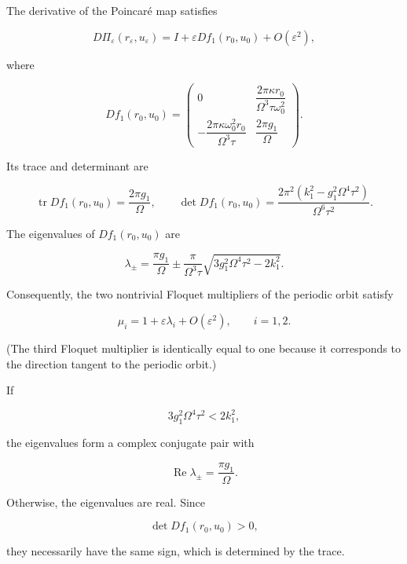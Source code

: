 \documentclass[11pt,reqno]{amsart}
\theoremstyle{plain}
\theoremstyle{definition}
\theoremstyle{remark}
\begin{document}
The derivative of the Poincaré map satisfies

\begin{equation}
\label{eq:poincare-derivative}
\boxed{
D\Pi_\varepsilon(r_\varepsilon,u_\varepsilon)
=
I
+
\varepsilon
Df_1(r_0,u_0)
+
O(\varepsilon^2),
}
\end{equation}

where

\[
Df_1(r_0,u_0)
=
\begin{pmatrix}
0
&
\dfrac{2\pi\kappa r_0}
{\Omega^3\tau\omega_0^2}
\\[5mm]
-\dfrac{2\pi\kappa\omega_0^2r_0}
{\Omega^3\tau}
&
\dfrac{2\pi g_1}{\Omega}
\end{pmatrix}.
\]

Its trace and determinant are

\begin{equation}
\label{eq:trace-det}
\boxed{
\operatorname{tr}Df_1(r_0,u_0)
=
\frac{2\pi g_1}{\Omega},
\qquad
\det Df_1(r_0,u_0)
=
\frac{
2\pi^2
\left(
k_1^2-g_1^2\Omega^4\tau^2
\right)
}
{\Omega^6\tau^2}.
}
\end{equation}

The eigenvalues of $Df_1(r_0,u_0)$ are

\begin{equation}
\label{eq:averaged-eigenvalues}
\boxed{
\lambda_\pm
=
\frac{\pi g_1}{\Omega}
\pm
\frac{\pi}
{\Omega^3\tau}
\sqrt{
3g_1^2\Omega^4\tau^2
-
2k_1^2
}.
}
\end{equation}

Consequently, the two nontrivial Floquet multipliers of the periodic
orbit satisfy

\begin{equation}
\label{eq:floquet-expansion}
\boxed{
\mu_i
=
1+\varepsilon\lambda_i
+
O(\varepsilon^2),
\qquad
i=1,2.
}
\end{equation}

(The third Floquet multiplier is identically equal to one because it
corresponds to the direction tangent to the periodic orbit.)

If

\[
3g_1^2\Omega^4\tau^2
<
2k_1^2,
\]

the eigenvalues form a complex conjugate pair with

\[
\operatorname{Re}\lambda_\pm
=
\frac{\pi g_1}{\Omega}.
\]

Otherwise, the eigenvalues are real. Since

\[
\det Df_1(r_0,u_0)>0,
\]

they necessarily have the same sign, which is determined by the trace.
\end{document}
